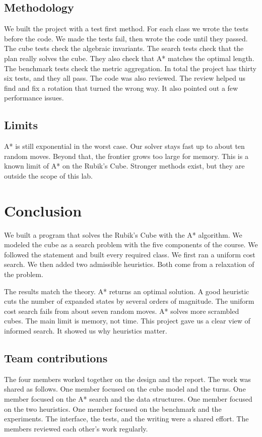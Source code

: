 \documentclass[11pt,a4paper]{article}
\begin{document}
\subsection{Methodology}

We built the project with a test first method. For each class we wrote the tests
before the code. We made the tests fail, then wrote the code until they passed.
The cube tests check the algebraic invariants. The search tests check that the
plan really solves the cube. They also check that A* matches the optimal length.
The benchmark tests check the metric aggregation. In total the project has
thirty six tests, and they all pass. The code was also reviewed. The review
helped us find and fix a rotation that turned the wrong way. It also pointed out
a few performance issues.

\subsection{Limits}

A* is still exponential in the worst case. Our solver stays fast up to about ten
random moves. Beyond that, the frontier grows too large for memory. This is a
known limit of A* on the Rubik's Cube. Stronger methods exist, but they are
outside the scope of this lab.

\section{Conclusion}

We built a program that solves the Rubik's Cube with the A* algorithm. We modeled
the cube as a search problem with the five components of the course. We followed
the statement and built every required class. We first ran a uniform cost search.
We then added two admissible heuristics. Both come from a relaxation of the
problem.

The results match the theory. A* returns an optimal solution. A good heuristic
cuts the number of expanded states by several orders of magnitude. The uniform
cost search fails from about seven random moves. A* solves more scrambled cubes.
The main limit is memory, not time. This project gave us a clear view of informed
search. It showed us why heuristics matter.

\subsection*{Team contributions}

The four members worked together on the design and the report. The work was
shared as follows. One member focused on the cube model and the turns. One member
focused on the A* search and the data structures. One member focused on the two
heuristics. One member focused on the benchmark and the experiments. The
interface, the tests, and the writing were a shared effort. The members reviewed
each other's work regularly.
\end{document}
